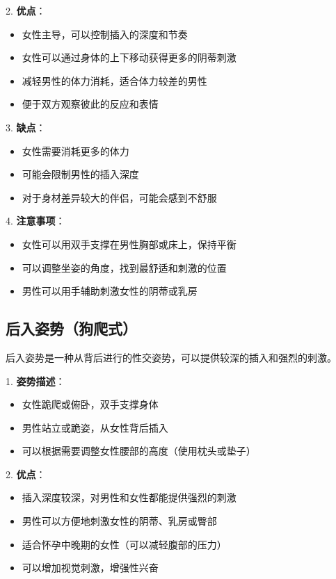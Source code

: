 \documentclass[12pt,UTF8]{ctexbook}
\begin{document}
2. \textbf{优点}：
  \begin{itemize}
  \item 女性主导，可以控制插入的深度和节奏
  \item 女性可以通过身体的上下移动获得更多的阴蒂刺激
  \item 减轻男性的体力消耗，适合体力较差的男性
  \item 便于双方观察彼此的反应和表情
  \end{itemize}

3. \textbf{缺点}：
  \begin{itemize}
  \item 女性需要消耗更多的体力
  \item 可能会限制男性的插入深度
  \item 对于身材差异较大的伴侣，可能会感到不舒服
  \end{itemize}

4. \textbf{注意事项}：
  \begin{itemize}
  \item 女性可以用双手支撑在男性胸部或床上，保持平衡
  \item 可以调整坐姿的角度，找到最舒适和刺激的位置
  \item 男性可以用手辅助刺激女性的阴蒂或乳房
  \end{itemize}

\subsection{后入姿势（狗爬式）}

后入姿势是一种从背后进行的性交姿势，可以提供较深的插入和强烈的刺激。

1. \textbf{姿势描述}：
  \begin{itemize}
  \item 女性跪爬或俯卧，双手支撑身体
  \item 男性站立或跪姿，从女性背后插入
  \item 可以根据需要调整女性腰部的高度（使用枕头或垫子）
  \end{itemize}

2. \textbf{优点}：
  \begin{itemize}
  \item 插入深度较深，对男性和女性都能提供强烈的刺激
  \item 男性可以方便地刺激女性的阴蒂、乳房或臀部
  \item 适合怀孕中晚期的女性（可以减轻腹部的压力）
  \item 可以增加视觉刺激，增强性兴奋
  \end{itemize}
\end{document}
